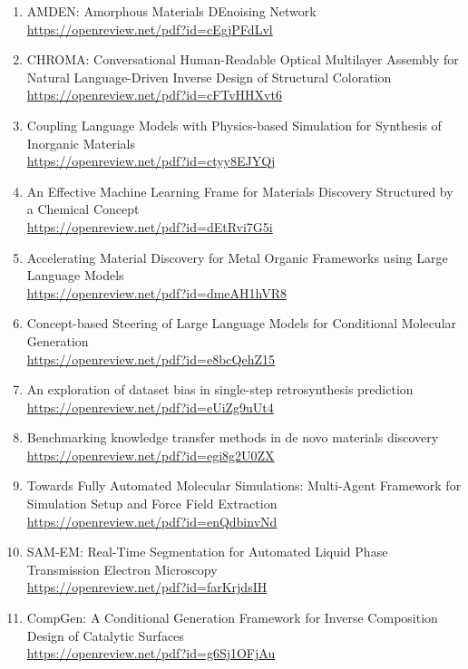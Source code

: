 \begin{enumerate}
        \url{https://openreview.net/pdf?id=bmgU7yWBeC}
  \item AMDEN: Amorphous Materials DEnoising Network\\
        \url{https://openreview.net/pdf?id=cEgjPFdLvl}
  \item CHROMA: Conversational Human-Readable Optical Multilayer Assembly for Natural Language-Driven Inverse Design of Structural Coloration\\
        \url{https://openreview.net/pdf?id=cFTvHHXvt6}
  \item Coupling Language Models with Physics-based Simulation for Synthesis of Inorganic Materials\\
        \url{https://openreview.net/pdf?id=ctyy8EJYQj}
  \item An Effective Machine Learning Frame for Materials Discovery Structured by a Chemical Concept\\
        \url{https://openreview.net/pdf?id=dEtRvi7G5i}
  \item Accelerating Material Discovery for Metal Organic Frameworks using Large Language Models\\
        \url{https://openreview.net/pdf?id=dmeAH1hVR8}
  \item Concept-based Steering of Large Language Models for Conditional Molecular Generation\\
        \url{https://openreview.net/pdf?id=e8bcQehZ15}
  \item An exploration of dataset bias in single-step retrosynthesis prediction\\
        \url{https://openreview.net/pdf?id=eUiZg9uUt4}
  \item Benchmarking knowledge transfer methods in de novo materials discovery\\
        \url{https://openreview.net/pdf?id=egi8g2U0ZX}
  \item Towards Fully Automated Molecular Simulations: Multi-Agent Framework for Simulation Setup and Force Field Extraction\\
        \url{https://openreview.net/pdf?id=enQdbinvNd}
  \item SAM-EM: Real-Time Segmentation for Automated Liquid Phase Transmission Electron Microscopy\\
        \url{https://openreview.net/pdf?id=farKrjdsIH}
  \item CompGen: A Conditional Generation Framework for Inverse Composition Design of Catalytic Surfaces\\
        \url{https://openreview.net/pdf?id=g6Sj1OFjAu}

\end{enumerate}
